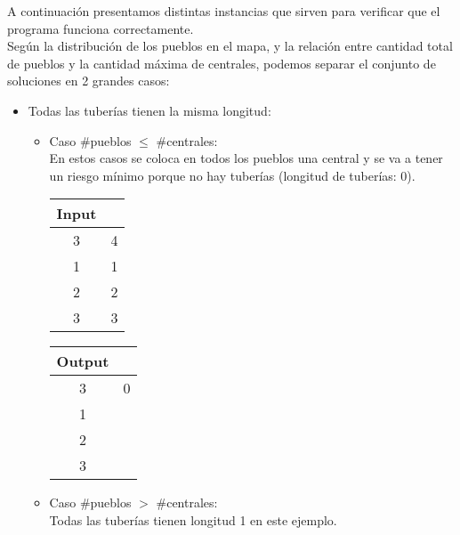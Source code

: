 \documentclass[11pt, a4paper, twoside]{article}
\begin{document}
{}
A continuaci\'on presentamos distintas instancias que sirven para verificar que el programa funciona correctamente.\\

Seg\'un la distribuci\'on de los pueblos en el mapa, y la relaci\'on entre cantidad total de pueblos y la cantidad 
m\'axima de centrales, podemos separar el conjunto de soluciones en 2 grandes casos: 

\begin{itemize}
	\item Todas las tuber\'ias tienen la misma longitud: 
			\begin{itemize}
				\item Caso \#pueblos $\le$ \#centrales: \\
					En estos casos se coloca en todos los pueblos una central y se va a tener un riesgo m\'inimo 
					porque no hay tuber\'ias (longitud de tuber\'ias: 0). \\
					
					 \begin{minipage}{0.2\textwidth}
						\begin{tabular}{cc}
						   Input \\
						   \hline
						   3 & 4 \\
						   1 & 1 \\
						   2 & 2 \\
						   3 & 3 \\
						\end{tabular}
					\end{minipage} 
					\begin{minipage}{0.2\textwidth}
						\begin{tabular}{cc}
						   Output \\
						   \hline
						   3 & 0 \\
						   1 &  \\
						   2 &  \\
						   3 &  \\
						\end{tabular}
					\end{minipage} 
					
				\item Caso \#pueblos  $>$ \#centrales: \\
					Todas las tuber\'ias tienen longitud 1 en este ejemplo. \\
					

\end{itemize}
\end{itemize}
\end{document}
